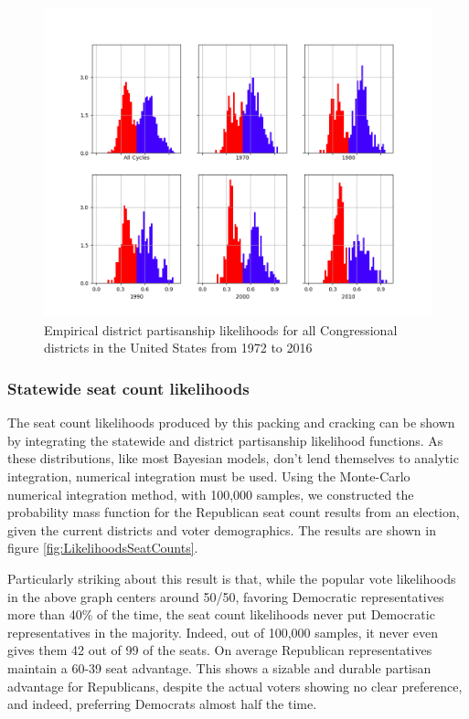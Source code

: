 \documentclass[preprint,12pt]{article}
\begin{document}
\begin{figure}[htb!]
    \begin{center}
        \includegraphics[scale=0.5]{../Figures/WI2010/cycle_partisan_likelihoods.png}
        \caption{Empirical district partisanship likelihoods for all Congressional districts in the United States from 1972 to 2016}\label{fig:LikelihoodsDistrictPartisanshipAll}
    \end{center}
\end{figure}
 
\subsubsection{Statewide seat count likelihoods}
 
The seat count likelihoods produced by this packing and cracking can be shown by integrating the statewide and district partisanship likelihood functions.  As these distributions, like most Bayesian models, don't lend themselves to analytic integration, numerical integration must be used. Using the Monte-Carlo numerical integration method, with 100,000 samples, we constructed the probability mass function for the Republican seat count results from an election, given the current districts and voter demographics.  The results are shown in figure \ref{fig:LikelihoodsSeatCounts}.
 
Particularly striking about this result is that, while the popular vote likelihoods in the above graph centers around 50/50, favoring Democratic representatives more than 40\% of the time, the seat count likelihoods never put Democratic representatives in the majority.  Indeed, out of 100,000 samples, it never even gives them 42 out of 99 of the seats.  On average Republican representatives maintain a 60-39 seat advantage.   This shows a sizable and durable partisan advantage for Republicans, despite the actual voters showing no clear preference, and indeed, preferring Democrats almost half the time.
\end{document}
